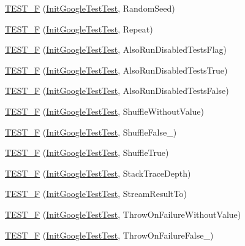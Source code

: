 \begin{DoxyCompactItemize}
\item 
\hyperlink{namespacetesting_a2a1e31fea507bdd6e011450e2f316bcf}{T\+E\+S\+T\+\_\+F} (\hyperlink{classtesting_1_1InitGoogleTestTest}{Init\+Google\+Test\+Test}, Random\+Seed)
\item 
\hyperlink{namespacetesting_a254368f412c980556143a9182f451981}{T\+E\+S\+T\+\_\+F} (\hyperlink{classtesting_1_1InitGoogleTestTest}{Init\+Google\+Test\+Test}, Repeat)
\item 
\hyperlink{namespacetesting_ab6624d856abda0913f536a4e719dd769}{T\+E\+S\+T\+\_\+F} (\hyperlink{classtesting_1_1InitGoogleTestTest}{Init\+Google\+Test\+Test}, Also\+Run\+Disabled\+Tests\+Flag)
\item 
\hyperlink{namespacetesting_a3e73dbd19fb50e5ad516de9592963033}{T\+E\+S\+T\+\_\+F} (\hyperlink{classtesting_1_1InitGoogleTestTest}{Init\+Google\+Test\+Test}, Also\+Run\+Disabled\+Tests\+True)
\item 
\hyperlink{namespacetesting_a1c50ef2a972315130f1613c69204e259}{T\+E\+S\+T\+\_\+F} (\hyperlink{classtesting_1_1InitGoogleTestTest}{Init\+Google\+Test\+Test}, Also\+Run\+Disabled\+Tests\+False)
\item 
\hyperlink{namespacetesting_a2f1fd86207e6c7085455dc2d582d1d12}{T\+E\+S\+T\+\_\+F} (\hyperlink{classtesting_1_1InitGoogleTestTest}{Init\+Google\+Test\+Test}, Shuffle\+Without\+Value)
\item 
\hyperlink{namespacetesting_a1acc3dcde65e75293451073528cb1c5a}{T\+E\+S\+T\+\_\+F} (\hyperlink{classtesting_1_1InitGoogleTestTest}{Init\+Google\+Test\+Test}, Shuffle\+False\+\_)
\item 
\hyperlink{namespacetesting_a24bb2b3783b9e0c419db7f974b641cd4}{T\+E\+S\+T\+\_\+F} (\hyperlink{classtesting_1_1InitGoogleTestTest}{Init\+Google\+Test\+Test}, Shuffle\+True)
\item 
\hyperlink{namespacetesting_af8579f8ad3383827814d1fbea4fdeee9}{T\+E\+S\+T\+\_\+F} (\hyperlink{classtesting_1_1InitGoogleTestTest}{Init\+Google\+Test\+Test}, Stack\+Trace\+Depth)
\item 
\hyperlink{namespacetesting_ad9cf0c452b4d2645b037725957021c6c}{T\+E\+S\+T\+\_\+F} (\hyperlink{classtesting_1_1InitGoogleTestTest}{Init\+Google\+Test\+Test}, Stream\+Result\+To)
\item 
\hyperlink{namespacetesting_a2824800277b4a1e8732abd5d7c2349d1}{T\+E\+S\+T\+\_\+F} (\hyperlink{classtesting_1_1InitGoogleTestTest}{Init\+Google\+Test\+Test}, Throw\+On\+Failure\+Without\+Value)
\item 
\hyperlink{namespacetesting_adfcdbd6b2715fddd03a47a822517ddea}{T\+E\+S\+T\+\_\+F} (\hyperlink{classtesting_1_1InitGoogleTestTest}{Init\+Google\+Test\+Test}, Throw\+On\+Failure\+False\+\_)

\end{DoxyCompactItemize}

